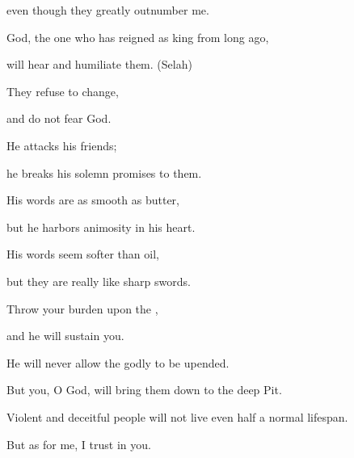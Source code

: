 {\par }{\Q even though
they greatly outnumber
me.
\par }{\Q {}God,
the one who has
reigned
as king from long ago,
\par }{\Q will hear
and humiliate
them. (Selah)
\par }{\Q They refuse
to change,
\par }{\Q and do not
fear
God.
\par }{\Q {}He attacks
his friends;
\par }{\Q he breaks
his solemn promises to them.
\par }{\Q {}His words are as smooth
as butter,
\par }{\Q but he harbors animosity
in his heart.
\par }{\Q His words
seem softer
than oil,
\par }{\Q but they
are really like sharp swords.
\par }{\Q {}Throw
your burden
upon
the {},
\par }{\Q and he will sustain
you.

\par }{\Q He will never
allow
the godly
to be upended.
\par }{\Q {}But you,
O God,
will bring them down
to the deep Pit.
\par }{\Q Violent
and deceitful
people
will not
live even half a normal
lifespan.
\par }{\Q But as for me, I
trust in you.


\par }
